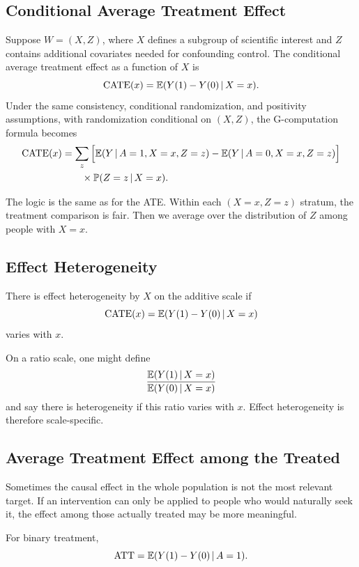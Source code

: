 \label{lec:3-7}

\subsection{Conditional Average Treatment Effect}

Suppose $W=(X,Z)$, where $X$ defines a subgroup of scientific interest and $Z$ contains additional covariates needed for confounding control. The conditional average treatment effect as a function of $X$ is
\[
\operatorname{CATE}(x)=\mathbb{E}(Y(1)-Y(0)\,\vert\, X=x).
\]
Under the same consistency, conditional randomization, and positivity assumptions, with randomization conditional on $(X,Z)$, the G-computation formula becomes
\[
\begin{aligned}
\operatorname{CATE}(x)
&=
\sum_z
\Big[
\mathbb{E}(Y\,\vert\, A=1,X=x,Z=z)
-
\mathbb{E}(Y\,\vert\, A=0,X=x,Z=z)
\Big] \\
&\qquad {}\times \mathbb{P}(Z=z\,\vert\, X=x).
\end{aligned}
\]

The logic is the same as for the ATE. Within each $(X=x,Z=z)$ stratum, the treatment comparison is fair. Then we average over the distribution of $Z$ among people with $X=x$.

\subsection{Effect Heterogeneity}

\begin{definition}
There is effect heterogeneity by $X$ on the additive scale if
\[
\operatorname{CATE}(x)=\mathbb{E}(Y(1)-Y(0)\,\vert\, X=x)
\]
varies with $x$.
\end{definition}

On a ratio scale, one might define
\[
\frac{\mathbb{E}(Y(1)\,\vert\, X=x)}{\mathbb{E}(Y(0)\,\vert\, X=x)}
\]
and say there is heterogeneity if this ratio varies with $x$. Effect heterogeneity is therefore scale-specific.

\subsection{Average Treatment Effect among the Treated}

Sometimes the causal effect in the whole population is not the most relevant target. If an intervention can only be applied to people who would naturally seek it, the effect among those actually treated may be more meaningful.

\begin{definition}
For binary treatment,
\[
\operatorname{ATT}=\mathbb{E}(Y(1)-Y(0)\,\vert\, A=1).
\]
\end{definition}

